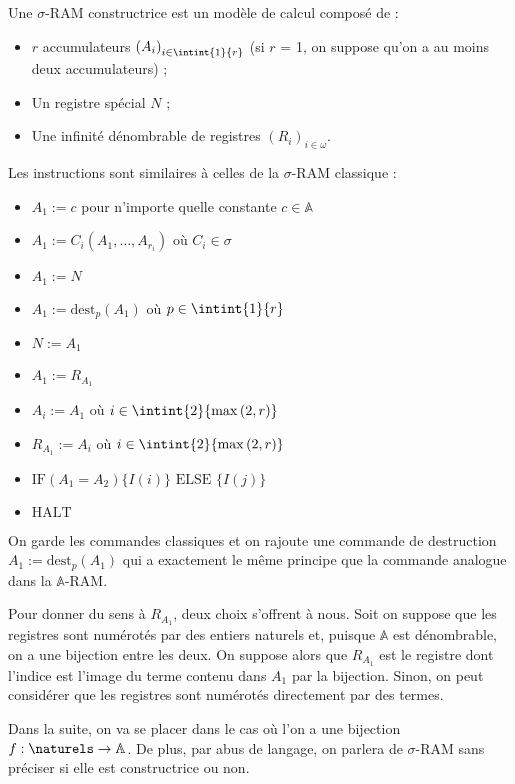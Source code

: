 \documentclass{article}
\newcommand{\sRAMifc}[2]{\text{IF} (A_1=A_2) \{I( #1 )\} \text{ ELSE } \{I( #2 )\}}
\newcommand{\bbA}{\mathbb{A}}
\begin{document}
			\begin{definition}
				Une $\sigma$-RAM constructrice est un modèle de calcul composé de :
				
				\begin{itemize}
					\setlength{\itemsep}{-1mm}
					\item	$r$ accumulateurs $\left(A_i\right)_{i\in \intint{1}{r}}$ (si $r$ = 1, on suppose qu'on a au moins deux accumulateurs) ;
					\item 	Un registre spécial $N$ ;
					\item 	Une infinité dénombrable de registres $\left( R_i\right)_{i \in \omega}$.
				\end{itemize}
			
				
				Les instructions sont similaires à celles de la $\sigma$-RAM classique :
				
				\begin{itemize}
					\setlength{\itemsep}{-1mm}
					\item 	$A_1 := c$ pour n'importe quelle constante $c \in \bbA$
					\item 	$A_1 := C_i(A_1, \dots, A_{r_i})$ où $C_i \in \sigma$
					\item 	$A_1 := N$
					\item 	$A_1 := \text{dest}_p(A_1)$ où $p \in \intint{1}{r}$
					\item 	$N := A_1$
					\item 	$A_1 := R_{A_1}$
					\item 	$A_i := A_1$ où $i \in \intint{2}{\max\left( 2, r \right)}$
					\item 	$R_{A_1} := A_i$ où $i \in \intint{2}{\max\left( 2, r \right)}$
					\item 	$\sRAMifc{i}{j}$
					\item 	$\text{HALT}$
				\end{itemize}
				
				On garde les commandes classiques et on rajoute une commande de destruction $A_1 := \text{dest}_p(A_1)$ qui a exactement le même principe que la commande analogue dans la $\bbA$-RAM.
				
				Pour donner du sens à $R_{A_1}$, deux choix s'offrent à nous. Soit on suppose que les registres sont numérotés par des entiers naturels et, puisque $\bbA$ est dénombrable, on a une bijection entre les deux. On suppose alors que $R_{A_1}$ est le registre dont l'indice est l'image du terme contenu dans $A_1$ par la bijection. Sinon, on peut considérer que les registres sont numérotés directement par des termes.
				
				Dans la suite, on va se placer dans le cas où l'on a une bijection $f : \naturels \to \bbA$.
				De plus, par abus de langage, on parlera de $\sigma$-RAM sans préciser si elle est constructrice ou non.
			\end{definition}
\end{document}
